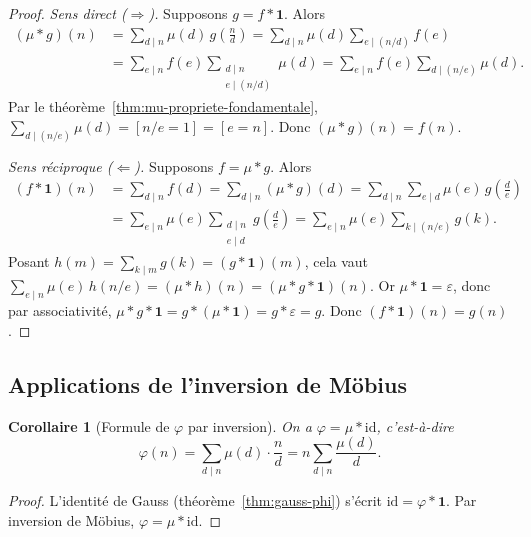 \documentclass[12pt,a4paper,openany]{book}
\theoremstyle{definition}
\theoremstyle{plain}
\newtheorem{corollaire}[definition]{Corollaire}
\theoremstyle{remark}
\begin{document}
\begin{proof}
\emph{Sens direct ($\Rightarrow$).} Supposons $g = f * \mathbf{1}$. Alors
\begin{align*}
  (\mu * g)(n) &= \sum_{d \mid n} \mu(d)\, g\!\left(\frac{n}{d}\right)
    = \sum_{d \mid n} \mu(d) \sum_{e \mid (n/d)} f(e) \\
    &= \sum_{e \mid n} f(e) \sum_{\substack{d \mid n \\ e \mid (n/d)}} \mu(d)
     = \sum_{e \mid n} f(e) \sum_{d \mid (n/e)} \mu(d).
\end{align*}
Par le théorème~\ref{thm:mu-propriete-fondamentale}, $\sum_{d \mid (n/e)} \mu(d) =
[n/e = 1] = [e = n]$. Donc $(\mu * g)(n) = f(n)$.

\emph{Sens réciproque ($\Leftarrow$).} Supposons $f = \mu * g$. Alors
\begin{align*}
  (f * \mathbf{1})(n) &= \sum_{d \mid n} f(d) = \sum_{d \mid n} (\mu * g)(d)
    = \sum_{d \mid n} \sum_{e \mid d} \mu(e)\, g\!\left(\frac{d}{e}\right) \\
    &= \sum_{e \mid n} \mu(e) \sum_{\substack{d \mid n \\ e \mid d}}
      g\!\left(\frac{d}{e}\right)
    = \sum_{e \mid n} \mu(e) \sum_{k \mid (n/e)} g(k).
\end{align*}
Posant $h(m) = \sum_{k \mid m} g(k) = (g * \mathbf{1})(m)$, cela vaut
$\sum_{e \mid n} \mu(e)\, h(n/e) = (\mu * h)(n) = (\mu * g * \mathbf{1})(n)$.
Or $\mu * \mathbf{1} = \varepsilon$, donc par associativité,
$\mu * g * \mathbf{1} = g * (\mu * \mathbf{1}) = g * \varepsilon = g$.
Donc $(f * \mathbf{1})(n) = g(n)$.
\end{proof}

\subsection{Applications de l'inversion de Möbius}

\begin{corollaire}[Formule de $\varphi$ par inversion]
\label{cor:phi-par-inversion}
On a $\varphi = \mu * \mathrm{id}$, c'est-à-dire
\[
  \varphi(n) = \sum_{d \mid n} \mu(d) \cdot \frac{n}{d}
    = n \sum_{d \mid n} \frac{\mu(d)}{d}.
\]
\end{corollaire}

\begin{proof}
L'identité de Gauss (théorème~\ref{thm:gauss-phi}) s'écrit
$\mathrm{id} = \varphi * \mathbf{1}$. Par inversion de Möbius,
$\varphi = \mu * \mathrm{id}$.
\end{proof}
\end{document}

